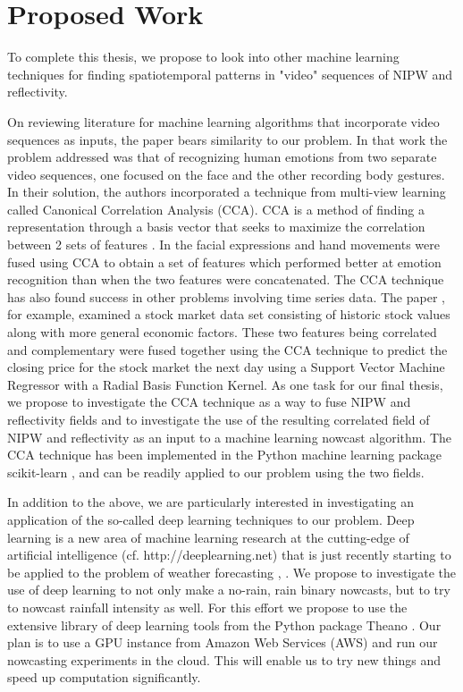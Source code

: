 \documentclass[proposal]{umassthesis}
\begin{document}
\section{Proposed Work}

To complete this thesis, we propose to look into other machine learning techniques for finding spatiotemporal patterns in "video" sequences of NIPW and reflectivity.

On reviewing literature for machine learning algorithms that incorporate video sequences as inputs, the paper \cite{shan2007beyond} bears similarity to our problem. In that work the problem addressed was that of recognizing human emotions from two separate video sequences, one focused on the face and the other recording body gestures. In their solution, the authors incorporated a technique from multi-view learning called Canonical Correlation Analysis (CCA). CCA is a method of finding a representation through a basis vector that seeks to maximize the correlation between 2 sets of features \cite{sun2013survey}. In \cite{shan2007beyond} the facial expressions and hand movements were fused using CCA to obtain a set of features which performed better at emotion recognition than when the two features were concatenated. The CCA technique has also found success in other problems involving time series data. The paper \cite{guo2014feature}, for example, examined a stock market data set consisting of historic stock values along with more general economic factors. These two features being correlated and complementary were fused together using the CCA technique to predict the closing price for the stock market the next day using a Support Vector Machine Regressor with a Radial Basis Function Kernel. As one task for our final thesis, we propose to investigate the CCA technique as a way to fuse NIPW and reflectivity fields and to investigate the use of the resulting correlated field of NIPW and reflectivity as an input to a machine learning nowcast algorithm. The CCA technique has been implemented in the Python machine learning package scikit-learn \cite{pedregosa2011scikit}, and can be readily applied to our problem using the two fields.

In addition to the above, we are particularly interested in investigating an application of the so-called deep learning techniques to our problem. Deep learning is a new area of machine learning research at the cutting-edge of artificial intelligence (cf. http://deeplearning.net) that is just recently starting to be applied to the problem of weather forecasting \cite{shi2015convolutional}, \cite{grover2015deep}. We propose to investigate the use of deep learning to not only make a no-rain, rain binary nowcasts, but to try to nowcast rainfall intensity as well. For this effort we propose to use the extensive library of deep learning tools from the Python package Theano \cite{bergstra+al:2010-scipy}. Our plan is to use a GPU instance from Amazon Web Services (AWS) and run our nowcasting experiments in the cloud. This will enable us to try new things and speed up computation significantly.
\end{document}
